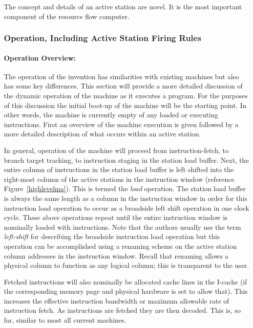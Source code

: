\documentclass[10pt,dvips]{article}
\begin{document}
The concept and details of an active station are novel. It is the most
important component of
the resource flow computer.

\subsubsection{Operation, Including Active Station Firing Rules}
\paragraph{Operation Overview: }
The operation of the invention has similarities with existing
machines but also has some key differences.  This section will provide
a more detailed discussion of the dynamic operation of the machine as
it executes a program.  For the purposes of this discussion the initial
boot-up of the machine will be the starting point.  In other words, the
machine is currently empty of any loaded or executing instructions.
First an overview of the machine execution is given followed by a more
detailed description of what occurs within an active station.

In general, operation of the machine will proceed from
instruction-fetch, to branch target tracking, to instruction staging in
the station load buffer.  Next, the entire column of instructions in
the station load buffer is left shifted into the right-most column
of the active stations in the instruction window (reference
Figure~\ref{highlevelma}).
This is termed the {\it load} operation.  The
station load buffer is always the same length as a column in the
instruction window in order for this instruction load operation to
occur as a broadside left shift operation in one clock cycle.
These above operations
repeat until the entire instruction window is nominally loaded with
instructions.  Note that
the authors usually use the term {\it left-shift} for describing the
broadside instruction load operation but this operation can be
accomplished using a renaming scheme on the active station column
addresses in the instruction window. Recall that renaming allows a
physical column to function as any logical column; this is
transparent to the user.

Fetched instructions will also nominally be allocated cache lines in
the I-cache (if the corresponding memory page and physical hardware is
set to allow that).  This increases the effective instruction bandwidth
or maximum allowable rate of instruction fetch.
As instructions are fetched they are then
decoded.  This is, so far, similar to most all current machines.
\end{document}
